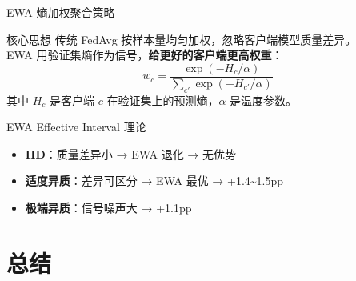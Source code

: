 \documentclass[aspectratio=169, 10pt]{beamer}
\begin{document}
\begin{frame}{EWA 熵加权聚合策略}
  \begin{block}{核心思想}
    传统 FedAvg 按样本量均匀加权，忽略客户端模型质量差异。\\
    EWA 用验证集熵作为信号，\textbf{给更好的客户端更高权重}：
    \[
      w_c = \frac{\exp(-H_c / \alpha)}{\sum_{c'} \exp(-H_{c'} / \alpha)}
    \]
    其中 $H_c$ 是客户端 $c$ 在验证集上的预测熵，$\alpha$ 是温度参数。
  \end{block}
  \vspace{0em}
  \begin{block}{EWA Effective Interval 理论}
    \begin{itemize}
      \item \textbf{IID}：质量差异小 → EWA 退化 → \alert{无优势}
      \item \textbf{适度异质}：差异可区分 → EWA 最优 → \alert{+1.4\textasciitilde 1.5pp}
      \item \textbf{极端异质}：信号噪声大 → \alert{+1.1pp}
    \end{itemize}
  \end{block}
\end{frame}

\section{总结}
\end{document}
